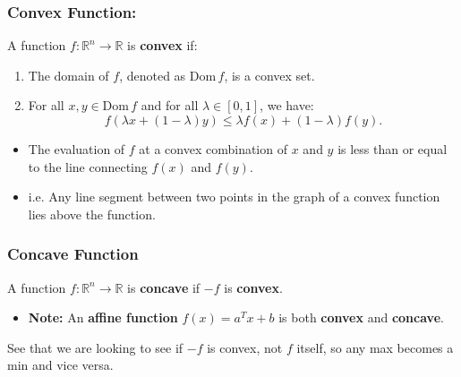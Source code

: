 \subsubsection{Convex Function:}
\begin{definition}
    A function $f : \mathbb{R}^n \to \mathbb{R}$ is \textbf{convex} if:
    \begin{enumerate}
        \item The domain of $f$, denoted as $\mathrm{Dom} \, f$, is a convex set.
        \item For all $x, y \in \mathrm{Dom} \, f$ and for all $\lambda \in [0, 1]$, we have:
        \[
        f(\lambda x + (1 - \lambda)y) \leq \lambda f(x) + (1 - \lambda) f(y).
        \]
    \end{enumerate}
    \begin{itemize}
        \item The evaluation of $f$ at a convex combination of $x$ and $y$ is less than or equal to the line connecting $f(x)$ and $f(y)$.
        \item i.e. Any line segment between two points in the graph of a convex function lies above the function. 
    \end{itemize}
\end{definition}

\subsubsection{Concave Function}
\begin{definition}
    A function $f : \mathbb{R}^n \to \mathbb{R}$ is \textbf{concave} if $-f$ is \textbf{convex}.
    \begin{itemize}
        \item \textbf{Note:} An \textbf{affine function} $f(x) = a^T x + b$ is both \textbf{convex} and \textbf{concave}.
    \end{itemize}
\end{definition}

\begin{example}
\end{example}

\begin{warning}
    See that we are looking to see if $-f$ is convex, not $f$ itself, so any max becomes a min and vice versa.
\end{warning}

